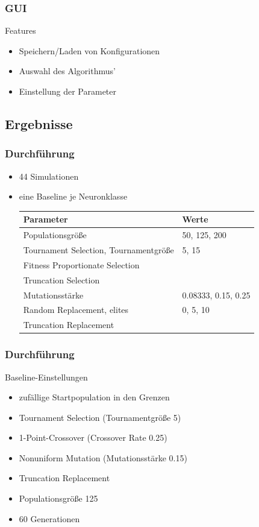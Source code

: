 \begin{frame}
  \frametitle{GUI}
  \begin{block}{Features}
    \begin{itemize}
    \item Speichern/Laden von Konfigurationen
    \item Auswahl des Algorithmus'
    \item Einstellung der Parameter
    \end{itemize}
  \end{block}
\end{frame}

\subsection{Ergebnisse}

\begin{frame}
  \frametitle{Durchführung}
  \begin{itemize}
  \item 44 Simulationen
  \item eine Baseline je Neuronklasse
    \scriptsize
    \begin{tabular}[H]{ll}
      Parameter & Werte \\\hline
      Populationsgröße & 50, 125, 200 \\ \arrayrulecolor{light-gray}\hline
      Tournament Selection, Tournamentgröße & 5, 15 \\
      Fitness Proportionate Selection & \\
      Truncation Selection  & \\ \hline
      Mutationsstärke & 0.08333, 0.15, 0.25 \\ \hline
      Random Replacement, elites & 0, 5, 10 \\
      Truncation Replacement & \\
    \end{tabular}
  \end{itemize}
\end{frame}

\begin{frame}
  \frametitle{Durchführung}
  Baseline-Einstellungen
  \begin{itemize}
    \item zufällige Startpopulation in den Grenzen
    \item Tournament Selection (Tournamentgröße 5)
    \item 1-Point-Crossover (Crossover Rate 0.25)
    \item Nonuniform Mutation (Mutationsstärke 0.15)
    \item Truncation Replacement
    \item Populationsgröße 125
    \item 60 Generationen
  \end{itemize}
\end{frame}


